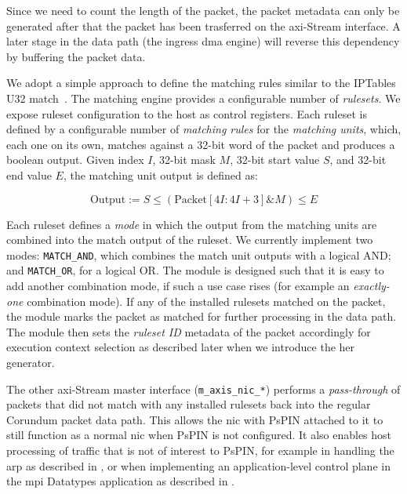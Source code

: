 Since we need to count the length of the packet, the packet metadata can only be generated after that the packet has been trasferred on the \ac{axi}-Stream interface.  A later stage in the data path (the ingress \ac{dma} engine) will reverse this dependency by buffering the packet data.

We adopt a simple approach to define the matching rules similar to the IPTables U32 match~\cite{cohen_iptables_nodate}.  The matching engine provides a configurable number of \emph{rulesets}.  We expose ruleset configuration to the host as control registers.  Each ruleset is defined by a configurable number of \emph{matching rules} for the \emph{matching units}, which, each one on its own, matches against a 32-bit word of the packet and produces a boolean output.  Given index $I$, 32-bit mask $M$, 32-bit start value $S$, and 32-bit end value $E$, the matching unit output is defined as:

\[
\text{Output} := S \le (\text{Packet}[4I:4I+3] \mathbin{\&} M) \le E
\]

Each ruleset defines a \emph{mode} in which the output from the matching units are combined into the match output of the ruleset.  We currently implement two modes: \texttt{MATCH\_\-AND}, which combines the match unit outputs with a logical AND; and \texttt{MATCH\_\-OR}, for a logical OR.  The module is designed such that it is easy to add another combination mode, if such a use case rises (for example an \emph{exactly-one} combination mode).  If any of the installed rulesets matched on the packet, the module marks the packet as matched for further processing in the data path.  The module then sets the \emph{ruleset ID} metadata of the packet accordingly for execution context selection as described later when we introduce the \ac{her} generator.

The other \ac{axi}-Stream master interface (\texttt{m\_\-axis\_\-nic\_\-*}) performs a \emph{pass-through} of packets that did not match with any installed rulesets back into the regular Corundum packet data path.  This allows the \ac{nic} with PsPIN attached to it to still function as a normal \ac{nic} when PsPIN is not configured.  It also enables host processing of traffic that is not of interest to PsPIN, for example in handling the \ac{arp} as described in , or when implementing an application-level control plane in the \ac{mpi} Datatypes application as described in .

